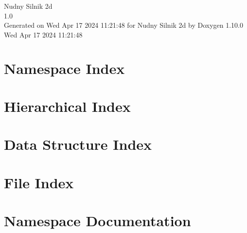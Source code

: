 \documentclass[twoside]{book}
\newcommand{\+}{\discretionary{\mbox{\scriptsize$\hookleftarrow$}}{}{}}
\newcommand{\clearemptydoublepage}{%
    \newpage{\pagestyle{empty}\cleardoublepage}%
  }
\begin{document}
  \raggedbottom
    \hypersetup{pageanchor=false,
                bookmarksnumbered=true,
                pdfencoding=unicode
               }
  \begin{titlepage}
  \vspace*{7cm}
  \begin{center}%
  {\Large Nudny Silnik 2d}\\
  [1ex]\large 1.\+0 \\
  \vspace*{1cm}
  {\large Generated on Wed Apr 17 2024 11\+:21\+:48 for Nudny Silnik 2d by Doxygen 1.10.0}\\
    \vspace*{0.5cm}
    {\small Wed Apr 17 2024 11:21:48}
  \end{center}
  \end{titlepage}
  \clearemptydoublepage
  \tableofcontents
  \clearemptydoublepage
  \hypersetup{pageanchor=true}
\chapter{Namespace Index}

\chapter{Hierarchical Index}

\chapter{Data Structure Index}

\chapter{File Index}

\chapter{Namespace Documentation}

\end{document}
